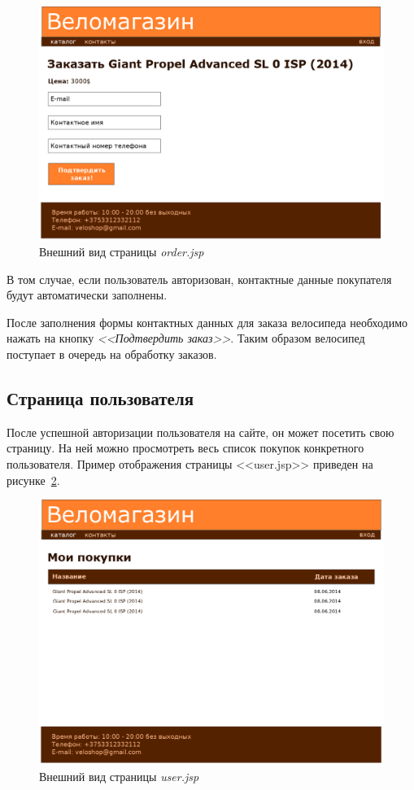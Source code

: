 \begin{figure}[h]
  \centering
  \includegraphics[width=150mm]{pic/order_template.png}
  \caption{Внешний вид страницы \textit{order.jsp}}
  \label{fig:order_jsp}
\end{figure}

В том случае, если пользователь авторизован, контактные данные покупателя
будут автоматически заполнены.

После заполнения формы контактных данных для заказа велосипеда необходимо нажать на кнопку
\textit{<<Подтвердить заказ>>}. Таким образом велосипед поступает в очередь на обработку
заказов.

\pagebreak

\subsection{Страница пользователя}

После успешной авторизации пользователя на сайте, он может посетить свою страницу.
На ней можно просмотреть весь список покупок конкретного пользователя.
Пример отображения страницы <<user.jsp>> приведен на рисунке~\ref{fig:user_jsp}.

\begin{figure}[h]
  \centering
  \includegraphics[width=150mm]{pic/user_template.png}
  \caption{Внешний вид страницы \textit{user.jsp}}
  \label{fig:user_jsp}
\end{figure}

